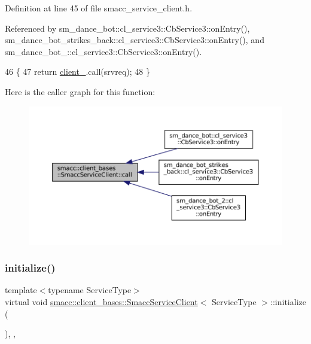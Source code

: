 Definition at line 45 of file smacc\+\_\+service\+\_\+client.\+h.



Referenced by sm\+\_\+dance\+\_\+bot\+::cl\+\_\+service3\+::\+Cb\+Service3\+::on\+Entry(), sm\+\_\+dance\+\_\+bot\+\_\+strikes\+\_\+back\+::cl\+\_\+service3\+::\+Cb\+Service3\+::on\+Entry(), and sm\+\_\+dance\+\_\+bot\+\_\+::cl\+\_\+service3\+::\+Cb\+Service3\+::on\+Entry().


\begin{DoxyCode}
46     \{
47         \textcolor{keywordflow}{return} \hyperlink{classsmacc_1_1client__bases_1_1SmaccServiceClient_a632093eb6bc8b058dec492b21c8536f9}{client\_}.call(srvreq);
48     \}
\end{DoxyCode}
Here is the caller graph for this function\+:
\nopagebreak
\begin{figure}[H]
\begin{center}
\leavevmode
\includegraphics[width=350pt]{classsmacc_1_1client__bases_1_1SmaccServiceClient_a0e9914f45f1091c38bb9ad6187d07977_icgraph}
\end{center}
\end{figure}
\mbox{\label{classsmacc_1_1client__bases_1_1SmaccServiceClient_aa51b80828e4ab19627210440ae15b6f3}} 
\subsubsection{\texorpdfstring{initialize()}{initialize()}}
{\footnotesize\ttfamily template$<$typename Service\+Type$>$ \\
virtual void \hyperlink{classsmacc_1_1client__bases_1_1SmaccServiceClient}{smacc\+::client\+\_\+bases\+::\+Smacc\+Service\+Client}$<$ Service\+Type $>$\+::initialize (\begin{DoxyParamCaption}{ }\end{DoxyParamCaption})\hspace{0.3cm}{\ttfamily [inline]}, {\ttfamily [override]}, {\ttfamily [virtual]}}




